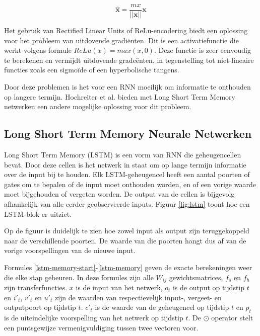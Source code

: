 \begin{equation}
    \mathbf{\hat{x}} = \frac{mx}{||\mathbf{x}||}\mathbf{x}
\end{equation}

Het gebruik van Rectified Linear Units of ReLu-encodering biedt een oplossing voor het probleem van uitdovende gradi\"enten. Dit is een activatiefunctie die werkt volgens formule $ReLu(x) = max(x,0)$. Deze functie is zeer eenvoudig te berekenen en vermijdt uitdovende grade\"enten, in tegenstelling tot niet-lineaire functies zoals een sigmo\"ide of een hyperbolische tangens\cite{Glorot2011}.

Door deze problemen is het voor een RNN moeilijk om informatie te onthouden op langere termijn. Hochreiter et al.\cite{SeppHochreiter1997} bieden met Long Short Term Memory netwerken een andere mogelijke oplossing voor dit probleem.

\subsection{Long Short Term Memory Neurale Netwerken}
\label{sub:lstm}
Long Short Term Memory (LSTM) is een vorm van RNN die geheugencellen bevat. Door deze cellen is het netwerk in staat om op lange termijn informatie over de input bij te houden. Elk LSTM-geheugencel heeft een aantal poorten of gates om te bepalen of de input moet onthouden worden, en of een vorige waarde moet bijgehouden of vergeten worden. De output van de cellen is bijgevolg afhankelijk van alle eerder geobserveerde inputs. Figuur \ref{fig:lstm} toont hoe een LSTM-blok er uitziet.\cite{SeppHochreiter1997,Google}

Op de figuur is duidelijk te zien hoe zowel input als output zijn teruggekoppeld naar de verschillende poorten. De waarde van die poorten hangt dus af van de vorige voorspellingen van de nieuwe input.

Formules \eqref{lstm-memory-start}-\eqref{lstm-memory} geven de exacte berekeningen weer die elke stap gebeuren. In deze formules zijn alle $W_{ij}$ gewichtsmatrices, $f_s$ en $f_h$ zijn transferfuncties. $x$ is de input van het netwerk, $o_t$ is de output op tijdstip $t$ en $i'_t$, $v'_t$ en $u'_t$ zijn de waarden van respectievelijk input-, vergeet- en outputpoort op tijdstip $t$. $c'_t$ is de waarde van de geheugencel op tijdstip $t$ en $p_t$ is de uiteindelijke voorspelling van het netwerk op tijdstip $t$. De $\odot$ operator stelt een puntsgewijze vermenigvuldiging tussen twee vectoren voor.


